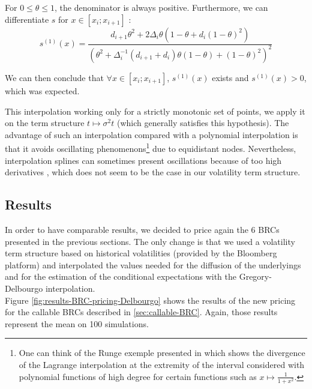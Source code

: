 \documentclass[a4paper,11pt,english]{book}
\begin{document}
For $0 \leq \theta \leq 1$, the denominator is always positive. Furthermore, we can differentiate $s$ for $x\in[x_i;x_{i+1}]$ :
$$s^{(1)}(x) = \frac{d_{i+1}\theta^2+2\Delta_i\theta(1-\theta+d_i(1-\theta)^2)}{(\theta^2+\Delta_i^{-1}(d_{i+1}+d_i)\theta(1-\theta)+(1-\theta)^2)^2}$$

We can then conclude that $\forall x\in[x_i;x_{i+1}]$, $s^{(1)}(x)$ exists and $s^{(1)}(x)>0$, which was expected.

This interpolation working only for a strictly monotonic set of points, we apply it on the term structure $t \mapsto \sigma^2 t$ (which generally satisfies this hypothesis). The advantage of such an interpolation compared with a polynomial interpolation is that it avoids oscillating phenomenons\footnote{One can think of the Runge exemple presented in \cite{quarteroni2000methodes} which shows the divergence of the Lagrange interpolation at the extremity of the interval considered with polynomial functions of high degree for certain functions such as $x \mapsto \frac{1}{1+x^2}$.} due to equidistant nodes. Nevertheless, interpolation splines can sometimes present oscillations because of too high derivatives \cite{quarteroni2000methodes}, which does not seem to be the case in our volatility term structure. 

\subsection{Results}
In order to have comparable results, we decided to price again the 6 BRCs presented in the previous sections. The only change is that we used a volatility term structure based on historical volatilities (provided by the Bloomberg platform) and interpolated the values needed for the diffusion of the underlyings and for the estimation of the conditional expectations with the Gregory-Delbourgo interpolation.\\

Figure \ref{fig:results-BRC-pricing-Delbourgo} shows the results of the new pricing for the callable BRCs described in \ref{sec:callable-BRC}. Again, those results represent the mean on 100 simulations.
\end{document}
